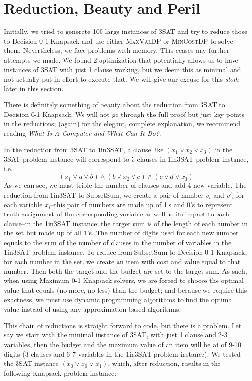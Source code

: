\documentclass[12pt, oneside]{book}
\begin{document}
\chapter{Reduction, Beauty and Peril}\label{reduction}

Initially, we tried to generate 100 large instances of 3SAT and try to
reduce those to Decision 0-1 Knapsack and use either \textsc{MaxValDP}
or \textsc{MinCostDP} to solve them. Nevertheless, we face problems with
memory. This ceases any further attempts we made. We found 2
optimization that potentially allows us to have instances of 3SAT with
just 1 clause working, but we deem this as minimal and not actually put
in effort to execute that. We will give our excuse for this \emph{sloth}
later in this section.

There is definitely something of beauty about the reduction from 3SAT to
Decision 0-1 Knapsack. We will not go through the full proof but just
key points in the reductions; (again) for the elegant, complete
explanation, we recommend reading \emph{What Is A Computer and What Can
It Do?}.

In the reduction from 3SAT to 1in3SAT, a clause like
\((x_1 \lor x_2 \lor x_3)\) in the 3SAT problem instance will correspond
to 3 clauses in 1in3SAT problem instance, i.e.
\[(\bar{x}_1 \lor a \lor b)\land (b \lor x_2 \lor c)\land (c \lor d \lor \bar{x}_3)\]
As we can see, we must triple the number of clauses and add 4 new
variable. The reduction from 1in3SAT to SubsetSum, we create a pair of
number \(v_i\) and \(v'_i\) for each variable \(x_i\)--this pair of
numbers are made up of 1's and 0's to represent truth assignment of the
corresponding variable as well as its impact to each clause--in the
1in3SAT instance; the target sum is of the length of each number in the
set but made up of all 1's. The number of digits used for each new
number equals to the sum of the number of clauses in the number of
variables in the 1in3SAT problem instance. To reduce from SubsetSum to
Decision 0-1 Knapsack, for each number in the set, we create an item
with cost and value equal to that number. Then both the target and the
budget are set to the target sum. As such, when using Maximum 0-1
Knapsack solvers, we are forced to choose the optimal value that equals
(no more, no less) than the budget; and because we require this
exactness, we must use dynamic programming algorithms to find the
optimal value instead of using any approximation-based algorithms.

This chain of reductions is straight forward to code, but there is a
problem. Let say we start with the minimal instance of 3SAT, with just 1
clause and 2-3 variables, then the budget and the maximum value of an
item will be at of 9-10 digits (3 clauses and 6-7 variables in the
1in3SAT problem instance). We tested the 3SAT instance
\((x_{0} \lor \bar{x}_{0} \lor \bar{x}_{1})\), which, after reduction,
results in the following Knapsack problem instance:
\end{document}
